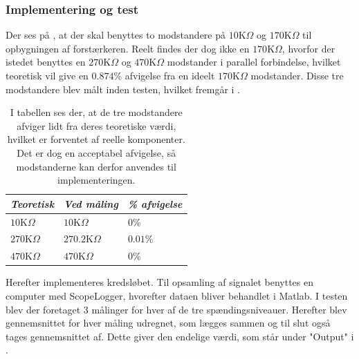 \subsubsection{Implementering og test}
Der ses på , at der skal benyttes to modstandere på $10$K$\Omega$ og $170$K$\Omega$ til opbygningen af forstærkeren. Reelt findes der dog ikke en $170$K$\Omega$, hvorfor der istedet benyttes en $270$K$\Omega$ og $470$K$\Omega$ modstander i parallel forbindelse, hvilket teoretisk vil give en $0.874$\% afvigelse fra en ideelt $170$K$\Omega$ modstander. Disse tre modstandere blev målt inden testen, hvilket fremgår i .
\begin{table}[H]
	\centering
	\begin{tabular}{|l|l|l|}
		\hline
		\textit{Teoretisk} & \textit{Ved måling} & \textit{\% afvigelse} \\ \hline
		$10$K$\Omega$       & $10$K$\Omega$        & $0$\%               \\ \hline
		$270$K$\Omega$      & $270.2$K$\Omega$     & $0.01$\%               \\ \hline
		$470$K$\Omega$      & $470$K$\Omega$       & $0$\%               \\ \hline
	\end{tabular}
	\caption{I tabellen ses der, at de tre modstandere afviger lidt fra deres teoretiske værdi, hvilket er forventet af reelle komponenter. Det er dog en acceptabel afvigelse, så modstanderne kan derfor anvendes til implementeringen.}
	\label{Tab:modstand_faktor18}
\end{table}

\noindent Herefter implementeres kredsløbet. Til opsamling af signalet benyttes en computer med ScopeLogger, hvorefter dataen bliver behandlet i Matlab. I testen blev der foretaget 3 målinger for hver af de tre spændingsniveauer. Herefter blev gennemsnittet for hver måling udregnet, som lægges sammen og til slut også tages gennemsnittet af. Dette giver den endelige værdi, som står under "Output" i .\

